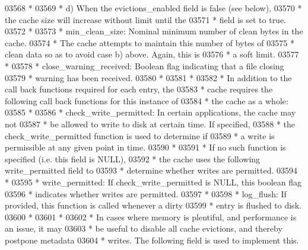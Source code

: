 \begin{DoxyCode}
03568 \textcolor{comment}{ *}
03569 \textcolor{comment}{ *      d) When the evictions\_enabled field is false (see below),}
03570 \textcolor{comment}{ *         the cache size will increase without limit until the}
03571 \textcolor{comment}{ *         field is set to true.}
03572 \textcolor{comment}{ *}
03573 \textcolor{comment}{ * min\_clean\_size: Nominal minimum number of clean bytes in the cache.}
03574 \textcolor{comment}{ *              The cache attempts to maintain this number of bytes of}
03575 \textcolor{comment}{ *              clean data so as to avoid case b) above.  Again, this is}
03576 \textcolor{comment}{ *              a soft limit.}
03577 \textcolor{comment}{ *}
03578 \textcolor{comment}{ * close\_warning\_received: Boolean flag indicating that a file closing }
03579 \textcolor{comment}{ *      warning has been received.}
03580 \textcolor{comment}{ *}
03581 \textcolor{comment}{ *}
03582 \textcolor{comment}{ * In addition to the call back functions required for each entry, the}
03583 \textcolor{comment}{ * cache requires the following call back functions for this instance of}
03584 \textcolor{comment}{ * the cache as a whole:}
03585 \textcolor{comment}{ *}
03586 \textcolor{comment}{ * check\_write\_permitted:  In certain applications, the cache may not}
03587 \textcolor{comment}{ *      be allowed to write to disk at certain time.  If specified,}
03588 \textcolor{comment}{ *      the check\_write\_permitted function is used to determine if}
03589 \textcolor{comment}{ *      a write is permissible at any given point in time.}
03590 \textcolor{comment}{ *}
03591 \textcolor{comment}{ *      If no such function is specified (i.e. this field is NULL),}
03592 \textcolor{comment}{ *      the cache uses the following write\_permitted field to}
03593 \textcolor{comment}{ *      determine whether writes are permitted.}
03594 \textcolor{comment}{ *}
03595 \textcolor{comment}{ * write\_permitted: If check\_write\_permitted is NULL, this boolean flag}
03596 \textcolor{comment}{ *      indicates whether writes are permitted.}
03597 \textcolor{comment}{ *}
03598 \textcolor{comment}{ * log\_flush:   If provided, this function is called whenever a dirty}
03599 \textcolor{comment}{ *      entry is flushed to disk.}
03600 \textcolor{comment}{ *}
03601 \textcolor{comment}{ *}
03602 \textcolor{comment}{ * In cases where memory is plentiful, and performance is an issue, it may}
03603 \textcolor{comment}{ * be useful to disable all cache evictions, and thereby postpone metadata}
03604 \textcolor{comment}{ * writes.  The following field is used to implement this.}

\end{DoxyCode}
